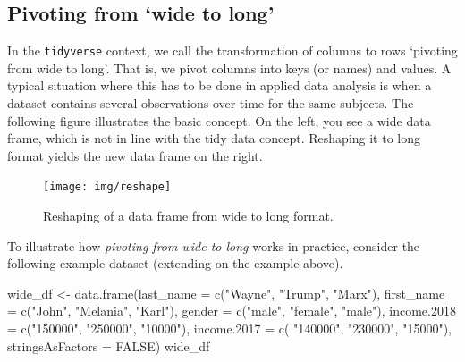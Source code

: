 \documentclass[
  12pt,
]{style/krantz}
\newenvironment{Shaded}{\begin{snugshade}}{\end{snugshade}}
\newcommand{\AttributeTok}[1]{\textcolor[rgb]{0.77,0.63,0.00}{#1}}
\newcommand{\ConstantTok}[1]{\textcolor[rgb]{0.00,0.00,0.00}{#1}}
\newcommand{\FunctionTok}[1]{\textcolor[rgb]{0.00,0.00,0.00}{#1}}
\newcommand{\NormalTok}[1]{#1}
\newcommand{\OtherTok}[1]{\textcolor[rgb]{0.56,0.35,0.01}{#1}}
\newcommand{\StringTok}[1]{\textcolor[rgb]{0.31,0.60,0.02}{#1}}
\begin{document}
\hypertarget{pivoting-from-wide-to-long}{%
\subsection{Pivoting from `wide to long'}\label{pivoting-from-wide-to-long}}

In the \texttt{tidyverse} context, we call the transformation of columns to rows `pivoting from wide to long'. That is, we pivot columns into keys (or names) and values. A typical situation where this has to be done in applied data analysis is when a dataset contains several observations over time for the same subjects. The following figure illustrates the basic concept. On the left, you see a wide data frame, which is not in line with the tidy data concept. Reshaping it to long format yields the new data frame on the right.

\begin{figure}

{\centering \texttt{[image: img/reshape]} 

}

\caption{Reshaping of a data frame from wide to long format.}\label{fig:widetolong}
\end{figure}



To illustrate how \emph{pivoting from wide to long} works in practice, consider the following example dataset (extending on the example above).

\begin{Shaded}
\begin{Highlighting}[]
\NormalTok{wide\_df }\OtherTok{\textless{}{-}} \FunctionTok{data.frame}\NormalTok{(}\AttributeTok{last\_name =} \FunctionTok{c}\NormalTok{(}\StringTok{"Wayne"}\NormalTok{, }\StringTok{"Trump"}\NormalTok{, }\StringTok{"Marx"}\NormalTok{),}
                       \AttributeTok{first\_name =} \FunctionTok{c}\NormalTok{(}\StringTok{"John"}\NormalTok{, }\StringTok{"Melania"}\NormalTok{, }\StringTok{"Karl"}\NormalTok{),}
                       \AttributeTok{gender =} \FunctionTok{c}\NormalTok{(}\StringTok{"male"}\NormalTok{, }\StringTok{"female"}\NormalTok{, }\StringTok{"male"}\NormalTok{),}
                       \AttributeTok{income.2018 =} \FunctionTok{c}\NormalTok{(}\StringTok{"150000"}\NormalTok{, }\StringTok{"250000"}\NormalTok{, }\StringTok{"10000"}\NormalTok{),}
                      \AttributeTok{income.2017 =} \FunctionTok{c}\NormalTok{( }\StringTok{"140000"}\NormalTok{, }\StringTok{"230000"}\NormalTok{, }\StringTok{"15000"}\NormalTok{),}
                      \AttributeTok{stringsAsFactors =} \ConstantTok{FALSE}\NormalTok{)}
\NormalTok{wide\_df}
\end{Highlighting}
\end{Shaded}
\end{document}
